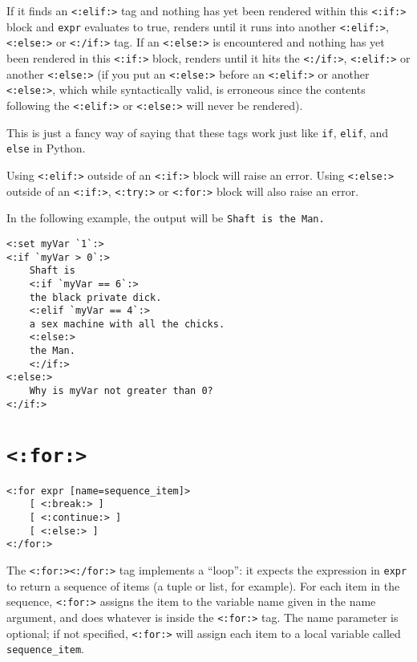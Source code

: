 \documentclass{manual}
\begin{document}
If it finds an \texttt{<:elif:>} tag and nothing has yet 
been rendered within this \texttt{<:if:>} block and 
\texttt{expr} evaluates to true, renders until it runs into 
another \texttt{<:elif:>}, \texttt{<:else:>} or 
\texttt{<:/if:>} tag. If an \texttt{<:else:>} is 
encountered and nothing has yet been rendered in this 
\texttt{<:if:>} block, renders until it hits the 
\texttt{<:/if:>}, \texttt{<:elif:>} or another \texttt{<:else:>} 
(if you put an \texttt{<:else:>} before an \texttt{<:elif:>} 
or another \texttt{<:else:>}, which while syntactically valid, 
is erroneous since the contents following the 
\texttt{<:elif:>} or \texttt{<:else:>} will never be rendered).

This is just a fancy way of saying that these tags work just
like \texttt{if}, \texttt{elif}, and \texttt{else} in Python.

Using \texttt{<:elif:>} outside of an \texttt{<:if:>} block will raise
an error. Using \texttt{<:else:>} outside of an \texttt{<:if:>},
\texttt{<:try:>} or \texttt{<:for:>} block will also raise an error.

In the following example, the output will be \texttt{Shaft is the Man.}

\begin{verbatim}
<:set myVar `1`:>
<:if `myVar > 0`:>
    Shaft is
    <:if `myVar == 6`:>
    the black private dick.
    <:elif `myVar == 4`:>
    a sex machine with all the chicks.
    <:else:>
    the Man.
    <:/if:>
<:else:>
    Why is myVar not greater than 0?
<:/if:>
\end{verbatim}


\section{\texttt{<:for:>}}
\label{tagfor}

\begin{verbatim}<:for expr [name=sequence_item]> 
    [ <:break:> ]
    [ <:continue:> ]
    [ <:else:> ] 
<:/for:>
\end{verbatim}

The \texttt{<:for:><:/for:>} tag implements a ``loop'': 
it expects the expression in \texttt{expr} to return a 
sequence of items (a tuple or list, for example). 
For each item in the sequence, \texttt{<:for:>} 
assigns the item to the variable name given 
in the name argument, and does whatever is 
inside the \texttt{<:for:>} tag. The name parameter 
is optional; if not specified, \texttt{<:for:>} 
will assign each item to a local variable 
called \texttt{sequence_item}.
\end{document}
